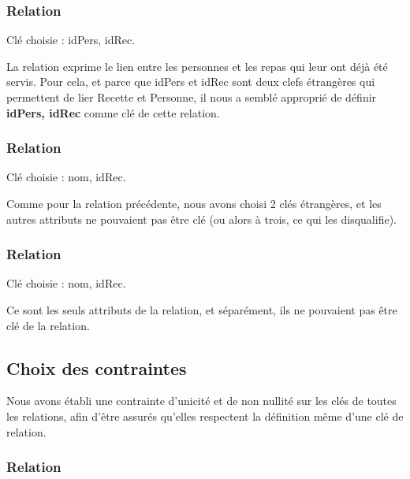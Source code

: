 \documentclass[a4paper,10pt]{report}
\begin{document}
 \subsubsection{Relation }
 	Clé choisie : idPers, idRec.
 	
	La relation exprime le lien entre les personnes et les repas qui leur ont déjà été servis. Pour cela, et parce que idPers et idRec sont deux clefs étrangères qui permettent de lier Recette et Personne, il nous a semblé approprié de définir \textbf{idPers, idRec} comme clé de cette relation.
	
 \subsubsection{Relation }
	Clé choisie : nom, idRec.
	
	Comme pour la relation précédente, nous avons choisi 2 clés étrangères, et les autres attributs ne pouvaient pas être clé (ou alors à trois, ce qui les disqualifie).
	
 \subsubsection{Relation }
 	Clé choisie :  nom, idRec.
 	
	Ce sont les seuls attributs de la relation, et séparément, ils ne pouvaient pas être clé de la relation.

\subsection{Choix des contraintes}
Nous avons établi une contrainte d'unicité et de non nullité sur les clés de toutes les relations, afin d'être assurés qu'elles respectent la définition même d'une clé de relation.

 \subsubsection{Relation }
 
\end{document}
